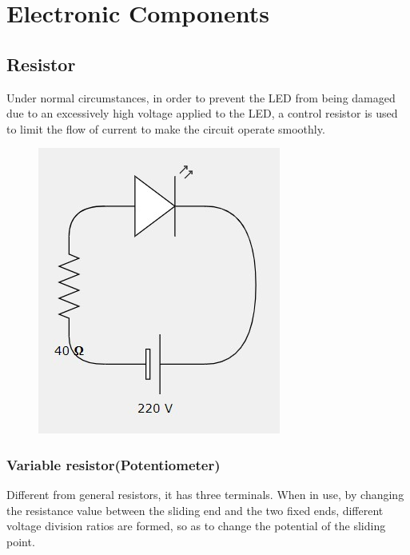 \documentclass[a4paper, 12pt, AutoFakeBold]{report}
\begin{document}
    \tableofcontents
    \chapter{Electronic Components}
    \section{Resistor}
    Under normal circumstances, in order to prevent the LED from being damaged due to an excessively high voltage applied to the LED, a control resistor is used to limit the flow of current to make the circuit operate smoothly.
    \begin{figure}[H]
        \centering
        \includegraphics[scale=.7]{figs/Fig1-1.jpg}
        \caption{}
        \label{fig:1.1}
    \end{figure}

    \subsection{Variable resistor(Potentiometer)}
    Different from general resistors, it has three terminals. When in use, by changing the resistance value between the sliding end and the two fixed ends, different voltage division ratios are formed, so as to change the potential of the sliding point.
\end{document}
